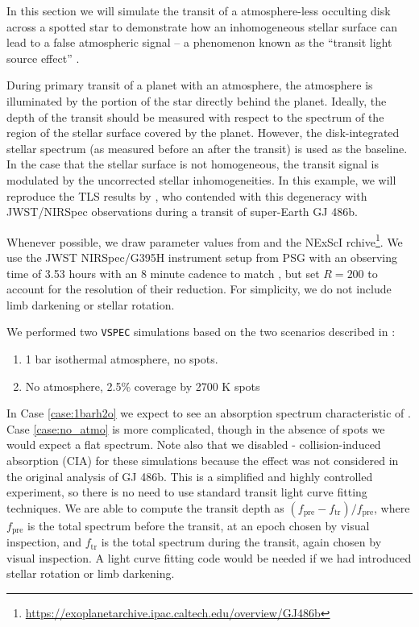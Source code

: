\documentclass[linenumbers,5p,twocolumn,authoryear]{elsarticle}
\newcommand{\vspec}[1]{\texttt{VSPEC}#1}
\begin{document}
In this section we will simulate the transit of a atmosphere-less occulting disk across a spotted star to demonstrate how an inhomogeneous
stellar surface can lead to a false atmospheric signal -- a phenomenon known as the ``transit light source effect'' \citep{rackham2018}.

During primary transit of a planet with an atmosphere, the atmosphere is illuminated by the portion of the star directly behind the planet. Ideally, the depth of the transit should be measured with respect to the spectrum of the region of the stellar surface covered by the planet. However, the disk-integrated stellar spectrum (as measured before an after the transit) is used as the baseline. In the case that the stellar surface is not homogeneous, the transit signal is modulated by the uncorrected stellar inhomogeneities. In this example, we will reproduce the TLS results by \citet{moran2023}, who contended with this degeneracy with JWST/NIRSpec observations during a transit of super-Earth GJ 486b.

Whenever possible, we draw parameter values from \citet{moran2023} and the NExScI rchive\footnote{\url{https://exoplanetarchive.ipac.caltech.edu/overview/GJ486b}}. We use the JWST NIRSpec/G395H instrument setup from PSG with an observing time of 3.53 hours with an 8 minute cadence to match \citet{moran2023}, but set $R=200$ to account for the resolution of their reduction. For simplicity, we do not include limb darkening or stellar rotation.

We performed two \vspec{} simulations based on the two scenarios described in \citet{moran2023}:
\begin{enumerate}
    \item 1 bar  isothermal atmosphere, no spots. \label{case:1barh2o}
    \item No atmosphere, 2.5\% coverage by 2700 K spots \label{case:no_atmo}
\end{enumerate}

In Case \ref{case:1barh2o} we expect to see an absorption spectrum characteristic of . Case \ref{case:no_atmo} is more complicated, though in the absence of spots we would expect a flat spectrum. Note also that we disabled - collision-induced absorption (CIA) for
these simulations because the effect was not considered in the original analysis of GJ 486b. This is a simplified and highly controlled experiment, so there is no need to use standard transit light curve fitting techniques. We are able to compute the transit depth as $(f_\text{pre}-f_\text{tr})/f_\text{pre}$, where $f_\text{pre}$ is the total spectrum before the transit, at an epoch chosen by visual inspection, and $f_\text{tr}$ is the total spectrum during the transit, again chosen by visual inspection. A light curve fitting code would be needed if we had introduced stellar rotation or limb darkening.
\end{document}
